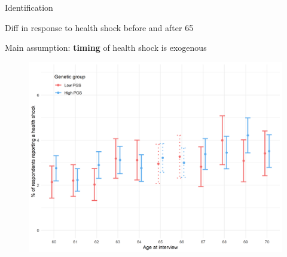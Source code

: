 \documentclass[10pt,compress,xcolor=dvipsnames]{beamer}    %
\newcounter{ex}
\newcommand{\1}[1]{\mathrm{1\hspace*{-2.5pt}l}[#1]}	%
\begin{document}
\begin{frame}{Identification}\label{frame:id}

Diff in response to health shock before and after 65


Main assumption: \textbf{timing} of health shock is exogenous \cite{Marti2017,Card2009medicare}


\begin{figure}[hbtp]
\centering
\includegraphics[height=0.75\textheight]{../../3_output/cv_prob/main_6070plot_pgs.png}
\label{fig:cv_prob}
\end{figure}

%
\end{frame}
\end{document}
